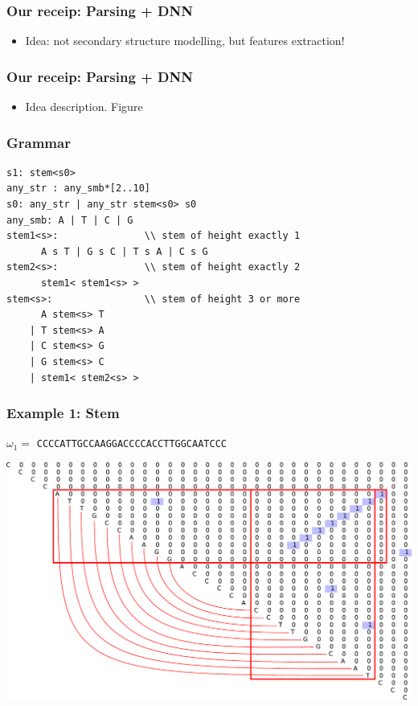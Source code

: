 \documentclass[xcolor=table]{beamer}
\begin{document}
\begin{frame}
  \transwipe[direction=90]
  \frametitle{Our receip: Parsing + DNN}

\begin{itemize}
  \item Idea: not secondary structure modelling, but features extraction!
\end{itemize}

\end{frame}


\begin{frame}
  \transwipe[direction=90]
  \frametitle{Our receip: Parsing + DNN}

\begin{itemize}
  \item Idea description. Figure
\end{itemize}

\end{frame}

\begin{frame}[fragile]
  \transwipe[direction=90]
  \frametitle{Grammar}
\begin{verbatim}
s1: stem<s0>
any_str : any_smb*[2..10]
s0: any_str | any_str stem<s0> s0
any_smb: A | T | C | G
stem1<s>:               \\ stem of height exactly 1
      A s T | G s C | T s A | C s G
stem2<s>:               \\ stem of height exactly 2
      stem1< stem1<s> >
stem<s>:                \\ stem of height 3 or more
      A stem<s> T
    | T stem<s> A
    | C stem<s> G
    | G stem<s> C
    | stem1< stem2<s> >
\end{verbatim}
\pause
{}
\end{frame}

\begin{frame}[fragile]
  \transwipe[direction=90]
  \frametitle{Example 1: Stem}
\centering
 $\omega_1=$ \texttt{CCCCATTGCCAAGGACCCCACCTTGGCAATCCC}
\vspace{1cm}

\includegraphics[width=.8\textwidth]{pictures/4.pdf}

\end{frame}
\end{document}
